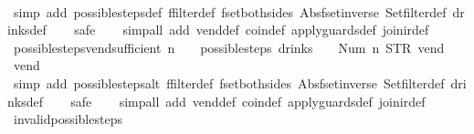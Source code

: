 \begin{isabellebody}
%
\isadelimproof
\ \ %
\endisadelimproof
%
\isatagproof
{}\isamarkupfalse%
\ {\isacharparenleft}simp\ add{\isacharcolon}\ possible{\isacharunderscore}steps{\isacharunderscore}def\ ffilter{\isacharunderscore}def\ fset{\isacharunderscore}both{\isacharunderscore}sides\ Abs{\isacharunderscore}fset{\isacharunderscore}inverse\ Set{\isachardot}filter{\isacharunderscore}def\ drinks{\isacharunderscore}def{\isacharparenright}\isanewline
\ \ \isamarkupfalse%
\ safe\isanewline
\ \ \isamarkupfalse%
\ {\isacharparenleft}simp{\isacharunderscore}all\ add{\isacharcolon}\ vend{\isacharunderscore}def\ coin{\isacharunderscore}def\ apply{\isacharunderscore}guards{\isacharunderscore}def\ join{\isacharunderscore}ir{\isacharunderscore}def{\isacharparenright}%
\endisatagproof
{\isafoldproof}%
%
\isadelimproof
\isanewline
%
\endisadelimproof
\isanewline
{}\isamarkupfalse%
\ possible{\isacharunderscore}steps{\isacharunderscore}vend{\isacharunderscore}sufficient{\isacharcolon}\ {\isachardoublequoteopen}n\ {\isachargreater}\ {}\ {\isasymLongrightarrow}\ possible{\isacharunderscore}steps\ drinks\ {}\ {\isacharparenleft}{\isacharless}{\isachargreater}{\isacharparenleft}{}\ {\isacharcolon}{\isacharequal}\ Num\ n{\isacharparenright}{\isacharparenright}\ STR\ {\isacharprime}{\isacharprime}vend{\isacharprime}{\isacharprime}\ {\isacharbrackleft}{\isacharbrackright}\ {\isacharequal}\ {\isacharbraceleft}{\isacharbar}{\isacharparenleft}{}{\isacharcomma}\ vend{\isacharparenright}{\isacharbar}{\isacharbraceright}{\isachardoublequoteclose}\isanewline
%
\isadelimproof
\ \ %
\endisadelimproof
%
\isatagproof
{}\isamarkupfalse%
\ {\isacharparenleft}simp\ add{\isacharcolon}\ possible{\isacharunderscore}steps{\isacharunderscore}alt\ ffilter{\isacharunderscore}def\ fset{\isacharunderscore}both{\isacharunderscore}sides\ Abs{\isacharunderscore}fset{\isacharunderscore}inverse\ Set{\isachardot}filter{\isacharunderscore}def\ drinks{\isacharunderscore}def{\isacharparenright}\isanewline
\ \ \isamarkupfalse%
\ safe\isanewline
\ \ \isamarkupfalse%
\ {\isacharparenleft}simp{\isacharunderscore}all\ add{\isacharcolon}\ vend{\isacharunderscore}def\ coin{\isacharunderscore}def\ apply{\isacharunderscore}guards{\isacharunderscore}def\ join{\isacharunderscore}ir{\isacharunderscore}def{\isacharparenright}%
\endisatagproof
{\isafoldproof}%
%
\isadelimproof
\isanewline
%
\endisadelimproof
\isanewline
{}\isamarkupfalse%
\ invalid{\isacharunderscore}possible{\isacharunderscore}steps{\isacharunderscore}{}{\isacharcolon}\isanewline

\end{isabellebody}
